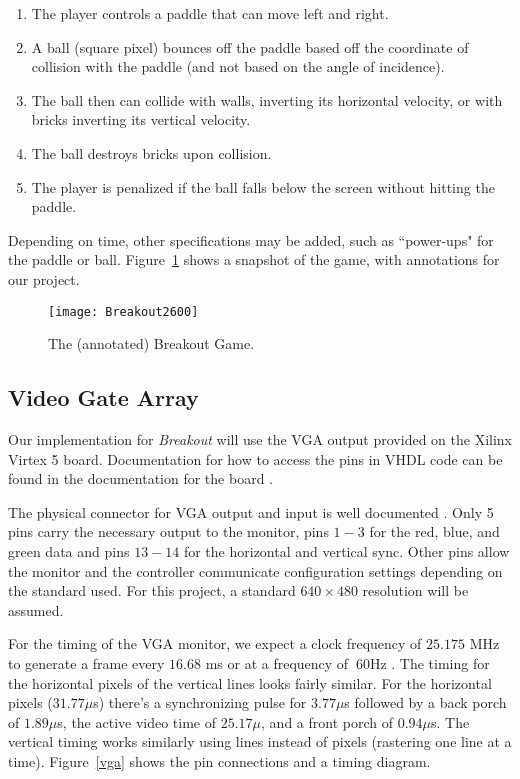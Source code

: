 \documentclass[conference]{IEEEtran}
\begin{document}
\begin{enumerate}
  \item The player controls a paddle that can move left and right.
  \item A ball (square pixel) bounces off the paddle based off the coordinate of collision with the paddle (and not based on the angle of incidence).
  \item The ball then can collide with walls, inverting its horizontal velocity, or with bricks inverting its vertical velocity.
  \item The ball destroys bricks upon collision.
  \item The player is penalized if the ball falls below the screen without hitting the paddle.
\end{enumerate}

Depending on time, other specifications may be added, such as ``power-ups" for the paddle or ball. Figure~\ref{Breakout} shows a snapshot of the game, with annotations for our project.

\begin{figure}[!t]
\centering
\texttt{[image: Breakout2600]}
\caption{The (annotated) Breakout Game.}
\label{Breakout}
\end{figure}

\subsection{Video Gate Array}
Our implementation for \emph{Breakout} will use the VGA output provided on the Xilinx Virtex 5 board. Documentation for how to access the pins in VHDL code can be found in the documentation for the board \cite{Xilinx:2011}.

The physical connector for VGA output and input is well documented \cite{Honza:2013}. Only 5 pins carry the necessary output to the monitor, pins $1-3$ for the red, blue, and green data and pins $13-14$ for the horizontal and vertical sync. Other pins allow the monitor and the controller communicate configuration settings depending on the standard used. For this project, a standard $640 \times 480$ resolution will be assumed.

For the timing of the VGA monitor, we expect a clock frequency of $25.175$ MHz to generate a frame every $16.68$ ms or at a frequency of $~60$Hz \cite{Stessen:1997}. The timing for the horizontal pixels of the vertical lines looks fairly similar. For the horizontal pixels ($31.77 \mu$s) there's a synchronizing pulse for $3.77 \mu$s followed by a back porch of $1.89\mu$s, the active video time of $25.17\mu$, and a front porch of $0.94\mu$s. The vertical timing works similarly using lines instead of pixels (rastering one line at a time). Figure~\ref{vga} shows the pin connections and a timing diagram.
\end{document}
